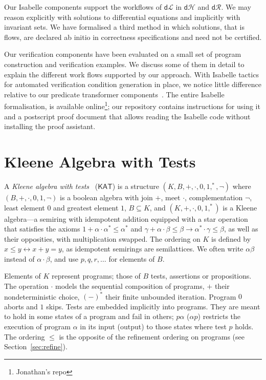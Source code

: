 \documentclass[envcountsame,envcountsect]{llncs}
\newcommand{\KAT}{\mathsf{KAT}}
\newcommand{\dL}{\mathsf{d}\mathcal{L}}
\newcommand{\dH}{\mathsf{d}\mathcal{H}}
\newcommand{\dR}{\mathsf{d}\mathcal{R}}
\begin{document}
Our Isabelle components support the  workflows of $\dL$ in $\dH$
and $\dR$. We may reason explicitly with solutions to differential
equations and implicitly with invariant sets. We have formalised a third
method in which solutions, that is flows, are declared ab initio in
correctness specifications and need not be certified.

Our verification components have been evaluated on a small set
of program construction and verification examples. We discuss some of
them in detail to explain the different work flows supported by our
approach. With Isabelle tactics for automated verification condition
generation in place, we notice little difference relative to our
predicate transformer components~\cite{MuniveS19}.  The entire
Isabelle formalisation, is available online\footnote{Jonathan's repo};
our repository contains instructions for using it and a postscript
proof document that allows reading the Isabelle code without
installing the proof assistant.



\section{Kleene Algebra with Tests}\label{sec:kat} 

A \emph{Kleene algebra with tests}~\cite{Kozen97} ($\KAT$) is a
structure $(K,B,+,\cdot,0,1,^\ast,\neg)$ where $(B,+,\cdot,0,1,\neg)$
is a boolean algebra with join $+$, meet $\cdot$, complementation
$\neg$, least element $0$ and greatest element $1$, $B\subseteq K$,
and $(K,+,\cdot,0,1,^\ast)$ is a Kleene algebra---a semiring with
idempotent addition equipped with a star operation that satisfies the
axioms $1+\alpha\cdot\alpha^\ast \le \alpha^\ast$ and
$\gamma+\alpha\cdot \beta\le \beta\rightarrow \alpha^\ast \cdot
\gamma\le \beta$,
as well as their opposities, with multiplication swapped.  The
ordering on $K$ is defined by $x\le y\leftrightarrow x+y=y$, as
idempotent semirings are semilattices. We often write $\alpha\beta$
instead of $\alpha\cdot\beta$, and use $p,q,r,\dots$ for elements of $B$.

Elements of $K$ represent programs; those of $B$ tests, assertions or
propositions.  The operation $\cdot$ models the sequential composition
of programs, $+$ their nondeterministic choice, $(-)^\ast$ their
finite unbounded iteration. Program $0$ aborts and $1$ skips.  Tests
are embedded implicitly into programs. They are meant to hold in some
states of a program and fail in others; $p\alpha$ ($\alpha p$)
restricts the execution of program $\alpha$ in its input (output) to
those states where test $p$ holds. The ordering $\le$ is the opposite
of the refinement ordering on programs (see Section~\ref{sec:refine}).
\end{document}
